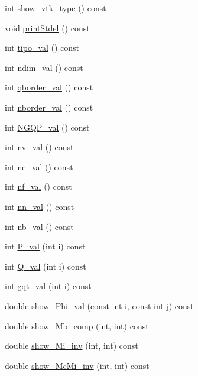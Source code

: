 \begin{DoxyCompactItemize}
\item 
int \hyperlink{classStdel_a56288a857b95a55c8b7eb5b473e836d9}{show\+\_\+vtk\+\_\+type} () const
\item 
void \hyperlink{classStdel_a54b5768d09f500cb949e66fc234eac70}{print\+Stdel} () const
\item 
int \hyperlink{classStdel_a75023fc369db2752845a9ce278f10929}{tipo\+\_\+val} () const
\item 
int \hyperlink{classStdel_a383df930bee8dc298d7d412b3b632ebb}{ndim\+\_\+val} () const
\item 
int \hyperlink{classStdel_a457d20e34fb7a32eb1e4aca6c19f53a2}{qborder\+\_\+val} () const
\item 
int \hyperlink{classStdel_aac8e97661e46c48fafa91f13caa03a9f}{nborder\+\_\+val} () const
\item 
int \hyperlink{classStdel_a2f964819235e0a55fd60733518b592f2}{N\+G\+Q\+P\+\_\+val} () const
\item 
int \hyperlink{classStdel_ae2ab461d1bc8d9f6006665fe03684845}{nv\+\_\+val} () const
\item 
int \hyperlink{classStdel_aa45f211663f5e8e47fdea32232ff23ea}{ne\+\_\+val} () const
\item 
int \hyperlink{classStdel_a2eed3ce0b73050e868989be78d918e5c}{nf\+\_\+val} () const
\item 
int \hyperlink{classStdel_a6086dceed8fe3dd410da0d6b84f02377}{nn\+\_\+val} () const
\item 
int \hyperlink{classStdel_a4fb0a049dc27d8e67665a56d1b5a18ba}{nb\+\_\+val} () const
\item 
int \hyperlink{classStdel_a701c7d5595d4f6632333c4202898983b}{P\+\_\+val} (int i) const
\item 
int \hyperlink{classStdel_aeea4659f5bcabbf1acb374180c43a293}{Q\+\_\+val} (int i) const
\item 
int \hyperlink{classStdel_a0775d0c4f7f15ae26bd45fc949e6f6b9}{gqt\+\_\+val} (int i) const
\item 
double \hyperlink{classStdel_a6565c36150823a1f52a2daf05806f7a4}{show\+\_\+\+Phi\+\_\+val} (const int i, const int j) const
\item 
double \hyperlink{classStdel_a4860f0f650640f859c5f75c206ee1f60}{show\+\_\+\+Mb\+\_\+comp} (int, int) const
\item 
double \hyperlink{classStdel_a11bf2897170ada9a9dd8f641a39585e5}{show\+\_\+\+Mi\+\_\+inv} (int, int) const
\item 
double \hyperlink{classStdel_a44d5aa234e02fb41afd5a4e5e45fadc4}{show\+\_\+\+Mc\+Mi\+\_\+inv} (int, int) const

\end{DoxyCompactItemize}
